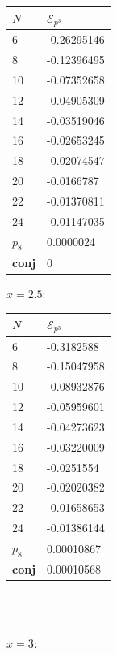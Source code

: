 \documentclass[a4paper,10pt]{article}
\begin{document}
\begin{table}[h]
\begin{minipage}{0.25\linewidth}
\begin{tabular}{ll}
$N$ & $\mathcal{E}_{p^3}$ \\
\hline
6 & -0.26295146 \\
8 & -0.12396495 \\
10 & -0.07352658 \\
12 & -0.04905309 \\
14 & -0.03519046 \\
16 & -0.02653245 \\
18 & -0.02074547 \\
20 & -0.0166787 \\
22 & -0.01370811 \\
24 & -0.01147035 \\
$p_8$ & \phantom{-}0.0000024\\
\bf{conj} &  \phantom{-}0\\
\hline
\end{tabular}
\end{minipage}%
\begin{minipage}{0.25\linewidth}
$x=2.5$: 


\begin{tabular}{ll}
$N$ & $\mathcal{E}_{p^3}$ \\
\hline
6 & -0.3182588 \\
8 & -0.15047958 \\
10 & -0.08932876 \\
12 & -0.05959601 \\
14 & -0.04273623 \\
16 & -0.03220009 \\
18 & -0.0251554 \\
20 & -0.02020382 \\
22 & -0.01658653 \\
24 & -0.01386144 \\
$p_8$ & \phantom{-}0.00010867\\
\bf{conj} &  \phantom{-}0.00010568\\
\hline
\end{tabular}
\end{minipage}%


~\\
~\\
\begin{minipage}{0.25\linewidth}
$x=3:$


\end{minipage}
\end{table}
\end{document}
